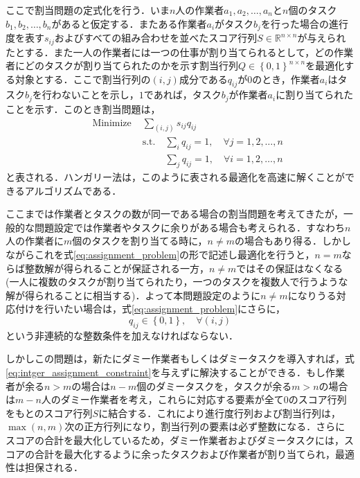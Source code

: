     ここで割当問題の定式化を行う．いま$n$人の作業者$a_1, a_2, \dots, a_n$と$n$個のタスク$b_1, b_2, \dots, b_n$があると仮定する．またある作業者$a_i$がタスク$b_j$を行った場合の進行度を表す$s_{ij}$およびすべての組み合わせを並べたスコア行列$S \in \mathbb{R}^{n \times n}$が与えられたとする．また一人の作業者には一つの仕事が割り当てられるとして，どの作業者にどのタスクが割り当てられたのかを示す割当行列$Q \in \left\{0, 1\right\}^{n \times n}$を最適化する対象とする．ここで割当行列の$(i,j)$成分である$q_{ij}$が$0$のとき，作業者$a_i$はタスク$b_j$を行わないことを示し，$1$であれば，タスク$b_j$が作業者$a_i$に割り当てられたことを示す．このとき割当問題は，
    \begin{equation}
        \label{eq:assignment_problem}
        \begin{aligned}
            &&\text{Minimize } &\sum _{(i, j)} s_{ij} q_{ij}  
            \\ &&&\text{s.t.}\quad \sum_i q_{ij} = 1,\quad \forall j = 1, 2, \dots, n
            \\ &&&\phantom{\text{s.t.}}\quad \sum_j q_{ij} = 1,\quad \forall i = 1,2,\dots, n
        \end{aligned}
    \end{equation}
    と表される．ハンガリー法\cite{kuhn1955hungarian}は，このように表される最適化を高速に解くことができるアルゴリズムである．

    ここまでは作業者とタスクの数が同一である場合の割当問題を考えてきたが，一般的な問題設定では作業者やタスクに余りがある場合も考えられる．すなわち$n$人の作業者に$m$個のタスクを割り当てる時に，$n \neq m$の場合もあり得る．しかしながらこれを式\ref{eq:assignment_problem}の形で記述し最適化を行うと，$n=m$ならば整数解が得られることが保証される一方，$n\neq m$ではその保証はなくなる (一人に複数のタスクが割り当てられたり，一つのタスクを複数人で行うような解が得られることに相当する)．よって本問題設定のように$n \neq m$になりうる対応付けを行いたい場合は，式\ref{eq:assignment_problem}にさらに，
    \begin{equation}
        \label{eq:intger_assignment_constraint}
        q_{ij} \in \left\{0, 1\right\}, \quad \forall (i,j)
    \end{equation}
    という非連続的な整数条件を加えなければならない．

    しかしこの問題は，新たにダミー作業者もしくはダミータスクを導入すれば，式\ref{eq:intger_assignment_constraint}を与えずに解決することができる．もし作業者が余る$n > m$の場合は$n-m$個のダミータスクを，タスクが余る$m > n$の場合は$m-n$人のダミー作業者を考え，これらに対応する要素が全て$0$のスコア行列をもとのスコア行列$S$に結合する．これにより進行度行列および割当行列は，$\max(n, m)$次の正方行列になり，割当行列の要素は必ず整数になる．さらにスコアの合計を最大化しているため，ダミー作業者およびダミータスクには，スコアの合計を最大化するように余ったタスクおよび作業者が割り当てられ，最適性は担保される．

